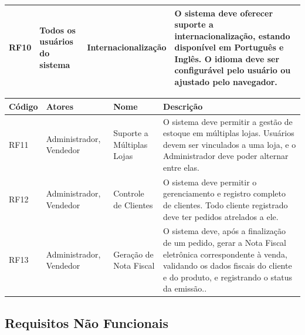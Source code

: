 \documentclass[
	12pt,				%
	openany,			%
	twoside,			%
	a4paper,			%
	english,			%
	brazil				%
	]{abntex2}
\begin{document}
\begin{quadro}[htb]
\begin{tabular}{|p{1.4cm}|p{2.8cm}|p{4.5cm}|p{7.0cm}|}
    RF10 & Todos os usuários do sistema & Internacionalização & O sistema deve oferecer suporte a internacionalização, estando disponível em Português e Inglês. O idioma deve ser configurável pelo usuário ou ajustado pelo navegador. \\ \hline

    

    

    

\end{tabular}
\end{quadro}

\FloatBarrier

\begin{quadro}[htb]
\centering
\caption{\label{quadro_rf3}Requisitos Funcionais (RF11 a RF13)}
\hspace*{-1cm}
\begin{tabular}{|p{1.4cm}|p{2.8cm}|p{4.5cm}|p{7.0cm}|}
    \hline
    \textbf{Código} & \textbf{Atores} & \textbf{Nome} & \textbf{Descrição} \\ \hline

   RF11 & Administrador, Vendedor & Suporte a Múltiplas Lojas & O sistema deve permitir a gestão de estoque em múltiplas lojas. Usuários devem ser vinculados a uma loja, e o Administrador deve poder alternar entre elas. \\ \hline

    RF12 & Administrador, Vendedor & Controle de Clientes & O sistema deve permitir o gerenciamento e registro completo de clientes. Todo cliente registrado deve ter pedidos atrelados a ele. \\ \hline

 RF13 & Administrador, Vendedor & Geração de Nota Fiscal & O sistema deve, após a finalização de um pedido, gerar a Nota Fiscal eletrônica correspondente à venda, validando os dados fiscais do cliente e do produto, e registrando o status da emissão.. \\ \hline

  

\end{tabular}
\end{quadro}

\FloatBarrier


\subsection{Requisitos Não Funcionais}
\end{document}
